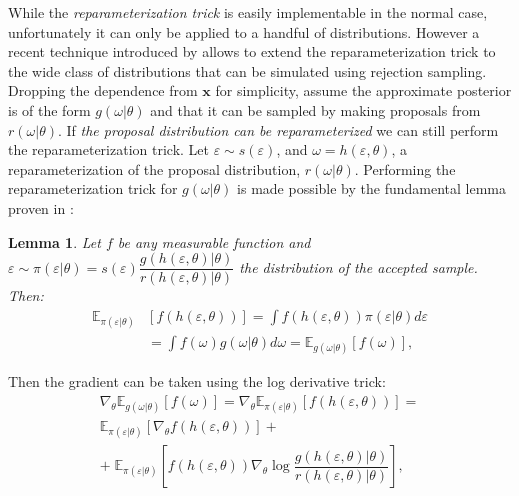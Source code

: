 \documentclass[letterpaper]{article}
\newtheorem{lem}{\textbf{Lemma}}
\newcommand{\E}{\mathbb{E}}
\newcommand{\x}{\mathbf{x}}
\begin{document}
While the \textit{reparameterization trick} is easily implementable in the normal case, unfortunately it can only be applied to a handful of distributions. However a recent technique introduced by \cite{rejection-repar} allows to extend the reparameterization trick to the wide class of distributions that can be simulated using rejection sampling. Dropping the dependence from $\x$ for simplicity, assume the approximate posterior is of the form $g(\omega| \theta)$ and that it can be sampled by making proposals from $r(\omega| \theta)$. If {\it the proposal distribution can be reparameterized} we can still perform the reparameterization trick. Let $\varepsilon \sim s(\varepsilon)$, and $\omega = h(\varepsilon,\theta)$, a reparameterization of the proposal distribution, $r(\omega|\theta)$. Performing the reparameterization trick for $g(\omega| \theta)$ is made possible by the fundamental lemma proven in \citep{rejection-repar}:
\begin{lem}\label{normal-repar}
Let $f$ be any measurable function and $\varepsilon \sim \pi(\varepsilon| \theta) = s(\varepsilon)\dfrac{g(h(\varepsilon,\theta)| \theta)}{r(h(\varepsilon,\theta)| \theta)}$ the distribution of the accepted sample.  Then:
\begin{align}
    \E_{ \pi(\varepsilon| \theta)} &[f(h(\varepsilon, \theta))] = \int f(h(\varepsilon, \theta))\pi(\varepsilon| \theta) d\varepsilon \nonumber \\
    &= \int f(\omega)g(\omega|\theta)d\omega = \E_{g(\omega|\theta)}[f(\omega)],
\end{align}
\end{lem}
Then the gradient can be taken using the log derivative trick:
\begin{align}\label{gcor+grep}
\nabla_{\theta}\E_{g(\omega|\theta)}[f(\omega)] = \nabla_{\theta} \E_{ \pi(\varepsilon| \theta)} [f(h(\varepsilon, \theta))] = \nonumber
\\
\E_{\pi(\varepsilon| \theta)}[ \nabla_{\theta} f(h(\varepsilon, \theta))] + \nonumber
\\
+ \;\E_{ \pi(\varepsilon| \theta)}\left[f(h(\varepsilon, \theta)) \nabla_{\theta}\log \dfrac{g(h(\varepsilon, \theta)|\theta)}{r(h(\varepsilon,\theta)|\theta)}\right],
\end{align}
\end{document}

